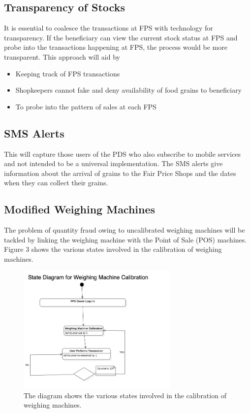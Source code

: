 \documentclass[a4paper,12pt]{extarticle}
\begin{document}
\subsection{Transparency of Stocks}
It is essential to coalesce the transactions at FPS with technology for transparency. If the beneficiary can view the current stock status at FPS and probe into the transactions happening at FPS, the process would be more transparent. This approach will aid by 
\begin{itemize}
\item Keeping track of FPS transactions
\item Shopkeepers cannot fake and deny availability of food grains to beneficiary
\item To probe into the pattern of sales at each FPS
\end{itemize}



\subsection{SMS Alerts}
This will capture those users of the PDS who also subscribe to mobile services and not intended to be a universal implementation.
The SMS alerts give information about the arrival of grains to the Fair Price Shops and the dates when they can collect their grains.

\subsection{Modified Weighing Machines}
The problem of quantity fraud owing to uncalibrated weighing machines will be tackled by linking the weighing machine with the Point of Sale (POS) machines. Figure 3 shows the various states  involved in the calibration of weighing machines.
\begin{figure}
\centering
\includegraphics[width=0.7\textwidth]{Weighing_Machine.jpg}
\caption{\label{fig:wieighing}The diagram shows the various states  involved in the calibration of weighing machines.}
\end{figure}
\end{document}
